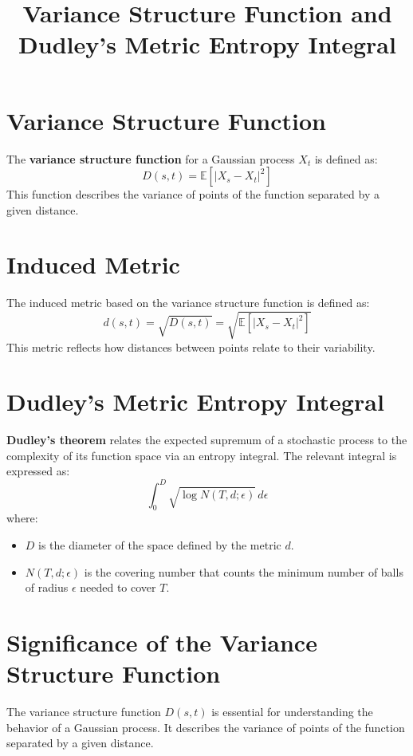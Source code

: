 \documentclass{article}
\title{Variance Structure Function and Dudley's Metric Entropy Integral}
\author{}
\date{}
\begin{document}
\maketitle

\section{Variance Structure Function}
The \textbf{variance structure function} for a Gaussian process $X_t$ is defined as:
\begin{equation}
D(s, t) = \mathbb{E}[|X_s - X_t|^2]
\end{equation}
This function describes the variance of points of the function separated by a given distance.

\section{Induced Metric}
The induced metric based on the variance structure function is defined as:
\begin{equation}
d(s, t) = \sqrt{D(s, t)} = \sqrt{\mathbb{E}[|X_s - X_t|^2]}
\end{equation}
This metric reflects how distances between points relate to their variability.

\section{Dudley’s Metric Entropy Integral}
\textbf{Dudley’s theorem} relates the expected supremum of a stochastic process to the complexity of its function space via an entropy integral. The relevant integral is expressed as:
\begin{equation}
\int_0^{D} \sqrt{\log N(T, d; \epsilon)} \, d\epsilon
\end{equation}
where:
\begin{itemize}
  \item $D$ is the diameter of the space defined by the metric $d$.
  \item $N(T, d; \epsilon)$ is the covering number that counts the minimum number of balls of radius $\epsilon$ needed to cover $T$.
\end{itemize}

\section{Significance of the Variance Structure Function}
The variance structure function $D(s, t)$ is essential for understanding the behavior of a Gaussian process. It describes the variance of points of the function separated by a given distance.
\end{document}
